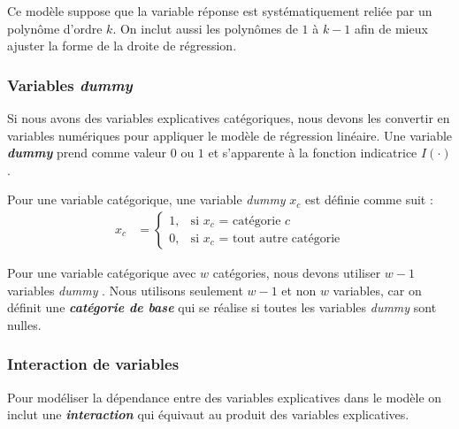 \documentclass[french]{article}
\begin{document}
\begin{multicols*}{2}
\begin{definitionNOHFILLsub}
\bigskip

Ce modèle suppose que la variable réponse est systématiquement reliée par un polynôme d'ordre $k$. On inclut aussi les polynômes de $1$ à $k - 1$ afin de mieux ajuster la forme de la droite de régression.
\end{definitionNOHFILLsub}



\subsubsection{Variables \og \textit{dummy} \fg{}}
\begin{rappel_enhanced}[Contexte]
Si nous avons des variables explicatives catégoriques, nous devons les convertir en variables numériques pour appliquer le modèle de régression linéaire. Une variable \og \textit{\textbf{dummy}} \fg{} prend comme valeur $0$ ou $1$ et s'apparente à la fonction indicatrice $I(\cdot)$.
\end{rappel_enhanced}

\begin{definitionNOHFILL}
Pour une variable catégorique, une variable \og \textit{dummy} \fg{} $x_{c}$ est définie comme suit :
\begin{align*}
	x_{c}
	&=	\begin{cases}
		1,	&	\text{si $x_{c}$ = catégorie $c$}	\\
		0,	&	\text{si $x_{c}$ = tout autre catégorie}
		\end{cases}
\end{align*}

\bigskip

Pour une variable catégorique avec $w$ catégories, nous devons utiliser $w - 1$ variables \og \textit{dummy} \fg{}. Nous utilisons seulement $w -  1$ et non $w$ variables, car on définit une \textbf{\textit{catégorie de base}} qui se réalise si toutes les variables \og \textit{dummy} \fg{} sont nulles.
\end{definitionNOHFILL}



\subsubsection{Interaction de variables}
\begin{rappel_enhanced}[Contexte]
Pour modéliser la dépendance entre des variables explicatives dans le modèle on inclut une \textbf{\textit{interaction}} qui équivaut au produit des variables explicatives. 
\end{rappel_enhanced}


\end{multicols*}
\end{document}
